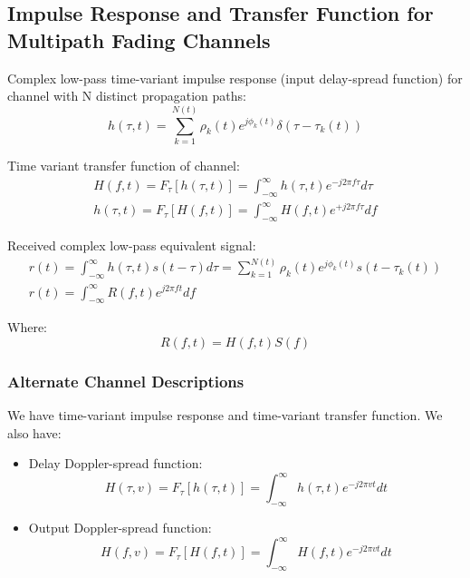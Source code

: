 \subsection{Impulse Response and Transfer Function for Multipath Fading Channels}
Complex low-pass time-variant impulse response (input delay-spread function) for channel with N distinct propagation paths:
\begin{equation}
    h(\tau,t) = \sum_{k=1}^{N(t)} \rho_k(t) e^{j \phi_k(t)} \delta(\tau - \tau_k(t))
\end{equation}

Time variant transfer function of channel:
\begin{gather}
    H(f,t) = F_\tau [h(\tau,t)] = \int_{-\infty}^\infty h(\tau,t) e^{-j2 \pi f \tau} d\tau \\
    h(\tau,t) = F_\tau [H(f,t)] = \int_{-\infty}^\infty H(f,t) e^{+j2 \pi f \tau} df
\end{gather}

Received complex low-pass equivalent signal:
\begin{gather}
    r(t) = \int_{-\infty}^\infty h(\tau,t) s(t-\tau) d\tau = \sum_{k=1}^{N(t)} \rho_k(t) e^{j \phi_k(t)} s(t - \tau_k(t)) \\
    r(t) = \int_{-\infty}^\infty R(f,t) e^{j2 \pi ft}df
\end{gather}

Where:
\begin{equation*}
    R(f,t) = H(f,t) S(f)
\end{equation*}

    \subsubsection{Alternate Channel Descriptions}
    We have time-variant impulse response and time-variant transfer function. We also have:
    \begin{itemize}
        \item Delay Doppler-spread function:
        \begin{equation}
            H(\tau,v) = F_\tau [h(\tau,t)] = \int_{-\infty}^\infty h(\tau,t) e^{-j2 \pi v t} dt
        \end{equation}
        \item Output Doppler-spread function:
        \begin{equation}
            H(f,v) = F_\tau [H(f,t)] = \int_{-\infty}^\infty H(f,t) e^{-j2 \pi v t} dt
        \end{equation}
    \end{itemize}
